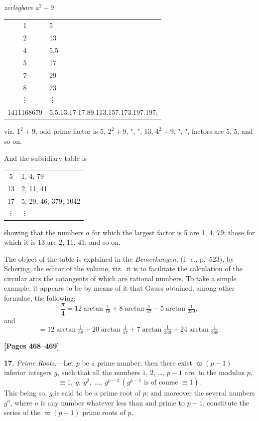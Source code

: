\documentclass[11pt,a4paper]{article}
\begin{document}
\begin{center}
\textit{zerlegbare} $a^{2}+9$
\end{center}
\begin{center}
\begin{tabular}{c|l}
1 & 5 \\
2 & 13 \\
4 & 5.5 \\
5 & 17 \\
7 & 29 \\
8 & 73 \\
\vdots & \vdots \\
1411168679 & 5.5.13.17.17.89.113.157.173.197.197;
\end{tabular}
\end{center}
viz. $1^{2}+9$, odd prime factor is 5, $2^{2}+9$, ",
", 13, $4^{2}+9$, ",
", factors are 5, 5, and so on.

And the subsidiary table is
\begin{center}
\begin{tabular}{c|l}
5 & 1, 4, 79 \\
13 & 2, 11, 41 \\
17 & 5, 29, 46, 379, 1042 \\
\vdots & \vdots
\end{tabular}
\end{center}
showing that the numbers $a$ for which the largest factor is 5 are 1, 4, 79; those for which it is 13 are 2, 11, 41; and so on.

The object of the table is explained in the \textit{Bemerkungen}, (l.\ c., p.\ 523), by Schering, the editor of the volume, viz.\ it is to facilitate the calculation of the circular arcs the cotangents of which are rational numbers. To take a simple example, it appears to be by means of it that Gauss obtained, among other formulae, the following:
\[\frac{\pi}{4} = 12 \arctan\tfrac{1}{18} + 8 \arctan\tfrac{1}{57} - 5 \arctan\tfrac{1}{239},\]
and
\[= 12 \arctan\tfrac{1}{38} + 20 \arctan\tfrac{1}{57} + 7 \arctan\tfrac{1}{239} + 24 \arctan\tfrac{1}{268}.\]


\newpage
\textbf{[Pages 468--469]}

\textbf{17.} \textit{Prime Roots.}---Let $p$ be a prime number; then there exist $\varpi(p-1)$ inferior integers $g$, such that all the numbers $1$, $2$, \ldots, $p-1$ are, to the modulus $p$,
\[\equiv 1,\ g,\ g^{2},\ \ldots,\ g^{p-2}\ (g^{p-1} \text{ is of course } \equiv 1).\]
This being so, $g$ is said to be a prime root of $p$; and moreover the several numbers $g^{a}$, where $a$ is any number whatever less than and prime to $p-1$, constitute the series of the $\varpi(p-1)$ prime roots of $p$.
\end{document}
